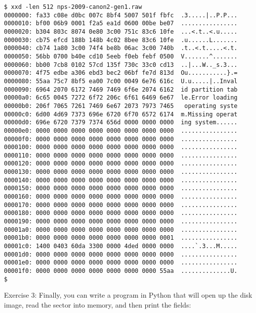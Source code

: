 \documentclass[11pt,letter]{book}
\begin{document}
\begin{Verbatim}
$ xxd -len 512 nps-2009-canon2-gen1.raw
0000000: fa33 c08e d0bc 007c 8bf4 5007 501f fbfc  .3.....|..P.P...
0000010: bf00 06b9 0001 f2a5 ea1d 0600 00be be07  ................
0000020: b304 803c 8074 0e80 3c00 751c 83c6 10fe  ...<.t..<.u.....
0000030: cb75 efcd 188b 148b 4c02 8bee 83c6 10fe  .u......L.......
0000040: cb74 1a80 3c00 74f4 be8b 06ac 3c00 740b  .t..<.t.....<.t.
0000050: 56bb 0700 b40e cd10 5eeb f0eb febf 0500  V.......^.......
0000060: bb00 7cb8 0102 57cd 135f 730c 33c0 cd13  ..|...W.._s.3...
0000070: 4f75 edbe a306 ebd3 bec2 06bf fe7d 813d  Ou...........}.=
0000080: 55aa 75c7 8bf5 ea00 7c00 0049 6e76 616c  U.u.....|..Inval
0000090: 6964 2070 6172 7469 7469 6f6e 2074 6162  id partition tab
00000a0: 6c65 0045 7272 6f72 206c 6f61 6469 6e67  le.Error loading
00000b0: 206f 7065 7261 7469 6e67 2073 7973 7465   operating syste
00000c0: 6d00 4d69 7373 696e 6720 6f70 6572 6174  m.Missing operat
00000d0: 696e 6720 7379 7374 656d 0000 0000 0000  ing system......
00000e0: 0000 0000 0000 0000 0000 0000 0000 0000  ................
00000f0: 0000 0000 0000 0000 0000 0000 0000 0000  ................
0000100: 0000 0000 0000 0000 0000 0000 0000 0000  ................
0000110: 0000 0000 0000 0000 0000 0000 0000 0000  ................
0000120: 0000 0000 0000 0000 0000 0000 0000 0000  ................
0000130: 0000 0000 0000 0000 0000 0000 0000 0000  ................
0000140: 0000 0000 0000 0000 0000 0000 0000 0000  ................
0000150: 0000 0000 0000 0000 0000 0000 0000 0000  ................
0000160: 0000 0000 0000 0000 0000 0000 0000 0000  ................
0000170: 0000 0000 0000 0000 0000 0000 0000 0000  ................
0000180: 0000 0000 0000 0000 0000 0000 0000 0000  ................
0000190: 0000 0000 0000 0000 0000 0000 0000 0000  ................
00001a0: 0000 0000 0000 0000 0000 0000 0000 0000  ................
00001b0: 0000 0000 0000 0000 0000 0000 0000 0001  ................
00001c0: 1400 0403 60da 3300 0000 4ded 0000 0000  ....`.3...M.....
00001d0: 0000 0000 0000 0000 0000 0000 0000 0000  ................
00001e0: 0000 0000 0000 0000 0000 0000 0000 0000  ................
00001f0: 0000 0000 0000 0000 0000 0000 0000 55aa  ..............U.
$ 
\end{Verbatim}

Exercise 3: Finally, you can write a program in Python that will open
up the disk image, read the sector into memory, and then print the
fields:
\end{document}

